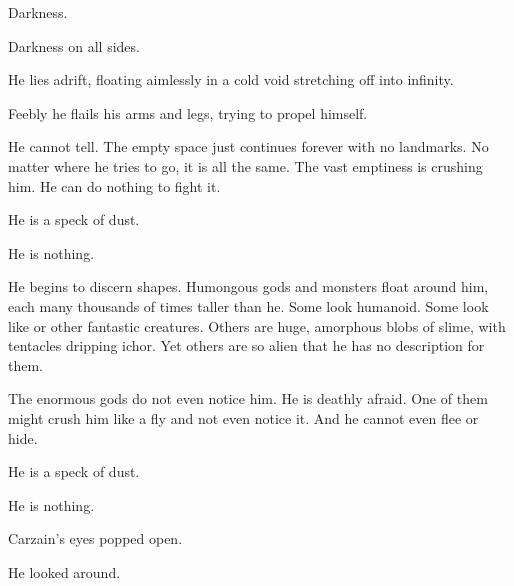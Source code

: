 \begin{comment}
\subsection{Dreaming}
\end{comment}

\new
\begin{dream}
Darkness. 

Darkness on all sides. 

He lies adrift, floating aimlessly in a cold void stretching off into infinity. 

Feebly he flails his arms and legs, trying to propel himself. 


He cannot tell. 
The empty space just continues forever with no landmarks. 
No matter where he tries to go, it is all the same. 
The vast emptiness is crushing him. 
He can do nothing to fight it. 

He is a speck of dust. 

He is nothing. 

He begins to discern shapes. 
Humongous gods and monsters float around him, each many thousands of times taller than he. 
Some look humanoid. 
Some look like \dragons{} or other fantastic creatures. 
Others are huge, amorphous blobs of slime, with tentacles dripping ichor. 
Yet others are so alien that he has no description for them. 

The enormous gods do not even notice him. 
He is deathly afraid. 
One of them might crush him like a fly and not even notice it. 
And he cannot even flee or hide. 

He is a speck of dust. 

He is nothing. 
\end{dream}




\begin{comment}
\subsection{Awakening}
\end{comment}

\new
Carzain's eyes popped open. 


He looked around. 


